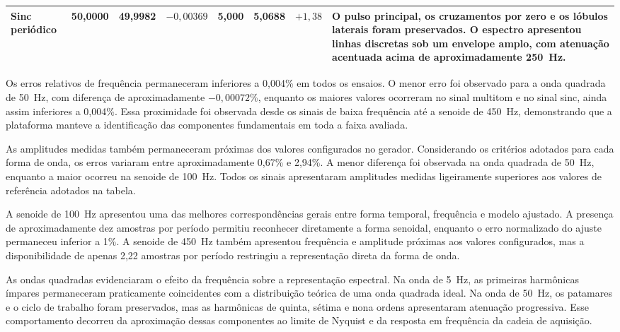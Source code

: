 \documentclass[a4paper,12pt]{fcte}
\begin{document}
\begin{landscape}
\begin{table}[p]
\begin{tabularx}{\linewidth}{p{2.0cm} c c p{1.5cm} c c p{1.5cm} X}
        Sinc periódico &
        50,0000 &
        49,9982 &
        $-0,00369$ &
        5,000 &
        5,0688 &
        $+1,38$ &
        O pulso principal, os cruzamentos por zero e os lóbulos laterais foram preservados. O espectro apresentou linhas discretas sob um envelope amplo, com atenuação acentuada acima de aproximadamente 250~Hz. \\

        \hline
    \end{tabularx}
\end{table}
\end{landscape}

Os erros relativos de frequência permaneceram inferiores a 0,004\% em todos os ensaios. O menor erro foi observado para a onda quadrada de 50~Hz, com diferença de aproximadamente $-0,00072$\%, enquanto os maiores valores ocorreram no sinal multitom e no sinal sinc, ainda assim inferiores a 0,004\%. Essa proximidade foi observada desde os sinais de baixa frequência até a senoide de 450~Hz, demonstrando que a plataforma manteve a identificação das componentes fundamentais em toda a faixa avaliada.

As amplitudes medidas também permaneceram próximas dos valores configurados no gerador. Considerando os critérios adotados para cada forma de onda, os erros variaram entre aproximadamente 0,67\% e 2,94\%. A menor diferença foi observada na onda quadrada de 50~Hz, enquanto a maior ocorreu na senoide de 100~Hz. Todos os sinais apresentaram amplitudes medidas ligeiramente superiores aos valores de referência adotados na tabela.

A senoide de 100~Hz apresentou uma das melhores correspondências gerais entre forma temporal, frequência e modelo ajustado. A presença de aproximadamente dez amostras por período permitiu reconhecer diretamente a forma senoidal, enquanto o erro normalizado do ajuste permaneceu inferior a 1\%. A senoide de 450~Hz também apresentou frequência e amplitude próximas aos valores configurados, mas a disponibilidade de apenas 2,22 amostras por período restringiu a representação direta da forma de onda.

As ondas quadradas evidenciaram o efeito da frequência sobre a representação espectral. Na onda de 5~Hz, as primeiras harmônicas ímpares permaneceram praticamente coincidentes com a distribuição teórica de uma onda quadrada ideal. Na onda de 50~Hz, os patamares e o ciclo de trabalho foram preservados, mas as harmônicas de quinta, sétima e nona ordens apresentaram atenuação progressiva. Esse comportamento decorreu da aproximação dessas componentes ao limite de Nyquist e da resposta em frequência da cadeia de aquisição.
\end{document}
